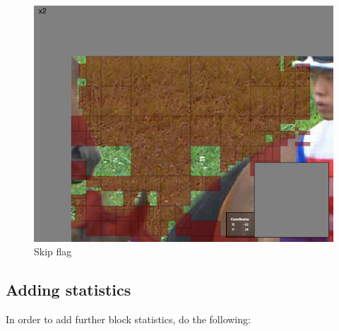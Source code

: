 \documentclass[a4paper,11pt]{jvetdoc}
\begin{document}
\begin{figure}[htpb]
  \centering
  \includegraphics[width=0.5\linewidth]{figures/raceHorsesShot3SkipFlag}
  \caption{Skip flag}
  \label{fig:skip-flag}
\end{figure}

\subsection{Adding statistics}
\label{sec:adding-statistics}

In order to add further block statistics, do the following:
\end{document}
